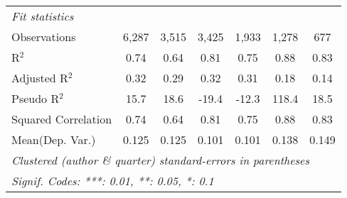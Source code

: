 \begin{tabular}{lcccccc}
   \midrule
   \emph{Fit statistics}\\
   Observations                                               & 6,287   & 3,515        & 3,425        & 1,933       & 1,278   & 677\\  
   R$^2$                                                      & 0.74    & 0.64         & 0.81         & 0.75        & 0.88    & 0.83\\  
   Adjusted R$^2$                                             & 0.32    & 0.29         & 0.32         & 0.31        & 0.18    & 0.14\\  
   Pseudo R$^2$                                               & 15.7    & 18.6         & -19.4        & -12.3       & 118.4   & 18.5\\  
   Squared Correlation                                        & 0.74    & 0.64         & 0.81         & 0.75        & 0.88    & 0.83\\  
Mean(Dep. Var.) & 0.125 & 0.125 & 0.101 & 0.101 & 0.138 & 0.149 \\
   \midrule \midrule
   \multicolumn{7}{l}{\emph{Clustered (author \& quarter) standard-errors in parentheses}}\\
   \multicolumn{7}{l}{\emph{Signif. Codes: ***: 0.01, **: 0.05, *: 0.1}}\\
\end{tabular}
\par\endgroup
